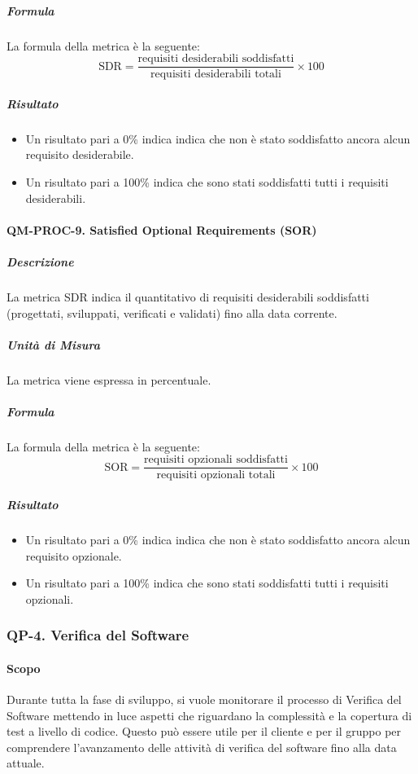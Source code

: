 			\subparagraph{Formula}
			La formula della metrica è la seguente:
			\[
				\text{SDR} = \frac{\text{requisiti desiderabili soddisfatti}}{\text{requisiti desiderabili totali}} \times 100
			\]

			\subparagraph{Risultato}
			\begin{itemize}
				\item Un risultato pari a 0\% indica indica che non è stato soddisfatto ancora alcun requisito desiderabile.
				\item Un risultato pari a 100\% indica che sono stati soddisfatti tutti i requisiti desiderabili.
			\end{itemize}

		\paragraph{QM-PROC-9. Satisfied Optional Requirements (SOR)}

			\subparagraph{Descrizione}
			La metrica SDR indica il quantitativo di requisiti desiderabili soddisfatti (progettati, sviluppati, verificati e validati) fino alla data corrente.

			\subparagraph{Unità di Misura}
			La metrica viene espressa in percentuale.

			\subparagraph{Formula}
			La formula della metrica è la seguente:
			\[
				\text{SOR} = \frac{\text{requisiti opzionali soddisfatti}}{\text{requisiti opzionali totali}} \times 100
			\]

			\subparagraph{Risultato}
			\begin{itemize}
				\item Un risultato pari a 0\% indica indica che non è stato soddisfatto ancora alcun requisito opzionale.
				\item Un risultato pari a 100\% indica che sono stati soddisfatti tutti i requisiti opzionali.
			\end{itemize}

	\subsubsection{QP-4. Verifica del Software}

		\paragraph{Scopo}

			Durante tutta la fase di sviluppo, si vuole monitorare il processo di Verifica del Software mettendo in luce aspetti che riguardano la complessità e la copertura di test a livello di codice. Questo può essere utile per il cliente e per il gruppo per comprendere l'avanzamento delle attività di verifica del software fino alla data attuale.

